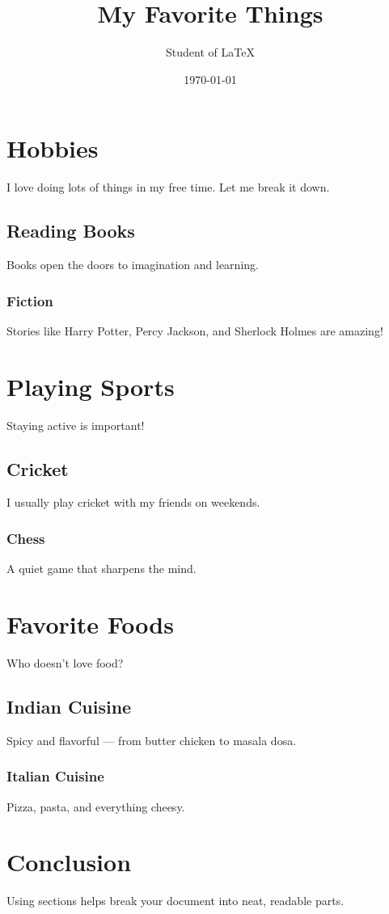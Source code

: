 \documentclass{article}
\title{My Favorite Things}
\author{Student of LaTeX}
\date{\today}
\begin{document}
\maketitle

\section{Hobbies}
I love doing lots of things in my free time. Let me break it down.

\subsection{Reading Books}
Books open the doors to imagination and learning.

\subsubsection{Fiction}
Stories like Harry Potter, Percy Jackson, and Sherlock Holmes are amazing!


\section{Playing Sports}
Staying active is important!

\subsection{Cricket}
I usually play cricket with my friends on weekends.

\subsubsection{Chess}
A quiet game that sharpens the mind.

\section{Favorite Foods}
Who doesn’t love food?

\subsection{Indian Cuisine}
Spicy and flavorful — from butter chicken to masala dosa.

\subsubsection{Italian Cuisine}
Pizza, pasta, and everything cheesy.

\section{Conclusion}
Using sections helps break your document into neat, readable parts.
\end{document}
